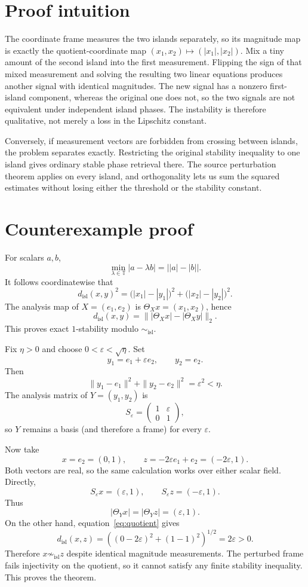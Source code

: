 \documentclass[11pt]{article}
\newcommand{\T}{\mathbb T}
\newcommand{\dI}{d_{\mathrm{isl}}}
\begin{document}
\section{Proof intuition}

The coordinate frame measures the two islands separately, so its magnitude
map is exactly the quotient-coordinate map $(x_1,x_2)\mapsto(|x_1|,|x_2|)$.
Mix a tiny amount of the second island into the first measurement. Flipping
the sign of that mixed measurement and solving the resulting two linear
equations produces another signal with identical magnitudes. The new signal
has a nonzero first-island component, whereas the original one does not, so
the two signals are not equivalent under independent island phases. The
instability is therefore qualitative, not merely a loss in the Lipschitz
constant.

Conversely, if measurement vectors are forbidden from crossing between
islands, the problem separates exactly. Restricting the original stability
inequality to one island gives ordinary stable phase retrieval there. The
source perturbation theorem applies on every island, and orthogonality lets us
sum the squared estimates without losing either the threshold or the
stability constant.

\section{Counterexample proof}

For scalars $a,b$,
\[
 \min_{\lambda\in\T}|a-\lambda b|=\big||a|-|b|\big|.
\]
It follows coordinatewise that
\begin{equation}\label{eq:quotient}
 \dI(x,y)^2=\big(|x_1|-|y_1|\big)^2+
                    \big(|x_2|-|y_2|\big)^2.
\end{equation}
The analysis map of $X=(e_1,e_2)$ is $\Theta_Xx=(x_1,x_2)$, hence
\[
 \dI(x,y)=\big\||\Theta_Xx|-|\Theta_Xy|\big\|_2.
\]
This proves exact $1$-stability modulo $\sim_{\mathrm{isl}}$.

Fix $\eta>0$ and choose $0<\varepsilon<\sqrt\eta$. Set
\[
 y_1=e_1+\varepsilon e_2,\qquad y_2=e_2.
\]
Then
\[
 \|y_1-e_1\|^2+\|y_2-e_2\|^2=\varepsilon^2<\eta.
\]
The analysis matrix of $Y=(y_1,y_2)$ is
\[
 S_\varepsilon=
 \begin{pmatrix}1&\varepsilon\\0&1\end{pmatrix},
\]
so $Y$ remains a basis (and therefore a frame) for every $\varepsilon$.

Now take
\[
 x=e_2=(0,1),\qquad z=-2\varepsilon e_1+e_2=(-2\varepsilon,1).
\]
Both vectors are real, so the same calculation works over either scalar
field. Directly,
\[
 S_\varepsilon x=(\varepsilon,1),
 \qquad S_\varepsilon z=(-\varepsilon,1).
\]
Thus
\[
 |\Theta_Yx|=|\Theta_Yz|=(\varepsilon,1).
\]
On the other hand, equation~\eqref{eq:quotient} gives
\[
 \dI(x,z)=
 \left((0-2\varepsilon)^2+(1-1)^2\right)^{1/2}
 =2\varepsilon>0.
\]
Therefore $x\not\sim_{\mathrm{isl}}z$ despite identical magnitude
measurements. The perturbed frame fails injectivity on the quotient, so it
cannot satisfy any finite stability inequality. This proves the theorem.
\end{document}
